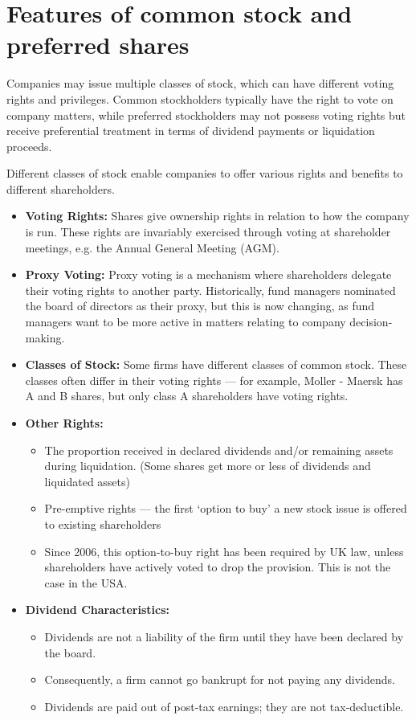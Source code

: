 \section{Features of common stock and preferred shares}

Companies may issue multiple classes of stock, which can have different voting rights and privileges.
Common stockholders typically have the right to vote on company matters, while preferred stockholders may not possess voting rights but receive preferential treatment in terms of dividend payments or liquidation proceeds.

Different classes of stock enable companies to offer various rights and benefits to different shareholders. 

\begin{itemize}
    \item \textbf{Voting Rights: }Shares give ownership rights in relation to how the company is run. These rights are invariably exercised through voting at shareholder meetings, e.g. the Annual General Meeting (AGM).
    \item \textbf{Proxy Voting: }Proxy voting is a mechanism where shareholders delegate their voting rights to another party. Historically, fund managers nominated the board of directors as their proxy, but this is now changing, as fund managers want to be more active in matters relating to company decision-making.
    \item \textbf{Classes of Stock: }Some firms have different classes of common stock. These classes often differ in their voting rights — for example, Moller - Maersk has A and B shares, but only class A shareholders have voting rights.
    \item \textbf{Other Rights: }
    \begin{itemize}
        \item The proportion received in declared dividends and/or remaining assets during liquidation. (Some shares get more or less of dividends and liquidated assets)
        \item Pre-emptive rights — the first ‘option to buy’ a new stock issue is offered to existing shareholders
        \item Since 2006, this option-to-buy right has been required by UK law, unless shareholders have actively voted to drop the provision. This is not the case in the USA.
    \end{itemize}
    \item \textbf{Dividend Characteristics: }
    \begin{itemize}
        \item Dividends are not a liability of the firm until they have been declared by the board.
        \item Consequently, a firm cannot go bankrupt for not paying any dividends.
        \item Dividends are paid out of post-tax earnings; they are not tax-deductible.
    \end{itemize}
\end{itemize}


